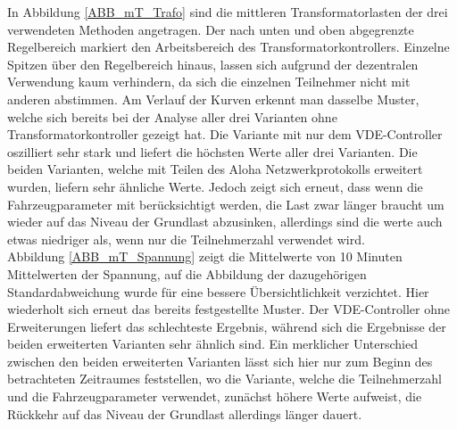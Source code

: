 In Abbildung \ref{ABB_mT_Trafo} sind die mittleren Transformatorlasten der drei verwendeten Methoden angetragen. Der nach unten und oben abgegrenzte Regelbereich markiert den Arbeitsbereich des Transformatorkontrollers. Einzelne Spitzen über den Regelbereich hinaus, lassen sich aufgrund der dezentralen Verwendung kaum verhindern, da sich die einzelnen Teilnehmer nicht mit anderen abstimmen. Am Verlauf der Kurven erkennt man dasselbe Muster, welche sich bereits bei der Analyse aller drei Varianten ohne Transformatorkontroller gezeigt hat. Die Variante mit nur dem VDE-Controller oszilliert sehr stark und liefert die höchsten Werte aller drei Varianten. Die beiden Varianten, welche mit Teilen des Aloha Netzwerkprotokolls erweitert wurden, liefern sehr ähnliche Werte. Jedoch zeigt sich erneut, dass wenn die Fahrzeugparameter mit berücksichtigt werden, die Last zwar länger braucht um wieder auf das Niveau der Grundlast abzusinken, allerdings sind die werte auch etwas niedriger als, wenn nur die Teilnehmerzahl verwendet wird.\\
Abbildung \ref{ABB_mT_Spannung} zeigt die Mittelwerte von 10 Minuten Mittelwerten der Spannung, auf die Abbildung der dazugehörigen Standardabweichung wurde für eine bessere Übersichtlichkeit verzichtet. Hier wiederholt sich erneut das bereits festgestellte Muster. Der VDE-Controller ohne Erweiterungen liefert das schlechteste Ergebnis, während sich die Ergebnisse der beiden erweiterten Varianten sehr ähnlich sind. Ein merklicher Unterschied zwischen den beiden erweiterten Varianten lässt sich hier nur zum Beginn des betrachteten Zeitraumes feststellen, wo die Variante, welche die Teilnehmerzahl und die Fahrzeugparameter verwendet, zunächst höhere Werte aufweist, die Rückkehr auf das Niveau der Grundlast allerdings länger dauert.\\
